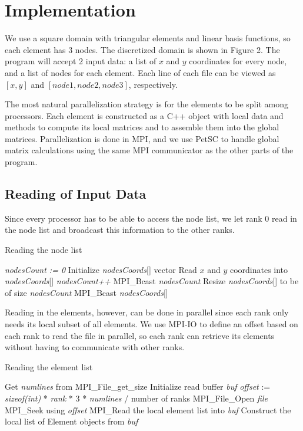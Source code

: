 \documentclass[12pt]{extreport}
\begin{document}
\section*{Implementation}
We use a square domain with triangular elements and linear basis functions, so each element has 3 nodes. The discretized domain is shown in Figure 2. The program will accept 2 input data: a list of $x$ and $y$ coordinates for every node, and a list of nodes for each element. Each line of each file can be viewed as $[x, y]$ and $[node1, node2, node3]$, respectively.

The most natural parallelization strategy is for the elements to be split among processors. Each element is constructed as a C++ object with local data and methods to compute its local matrices and to assemble them into the global matrices. Parallelization is done in MPI, and we use PetSC to handle global matrix calculations using the same MPI communicator as the other parts of the program.

\subsection*{Reading of Input Data}
 Since every processor has to be able to access the node list, we let rank 0 read in the node list and broadcast this information to the other ranks.
\begin{algorithm}
  \caption{Reading the node list}
  \begin{algorithmic}
     
    \State \textit{nodesCount := 0}
    \State Initialize \textit{nodesCoords}[] vector
    \State Read $x$ and $y$ coordinates into \textit{nodesCoords}[]
    \State \textit{nodesCount++}
    \EndFor
    \EndIf
    \State MPI\_Bcast \textit{nodesCount}
    \State Resize \textit{nodesCoords}[] to be of size \textit{nodesCount}
    \State MPI\_Bcast \textit{nodesCoords}[]
    \EndProcedure
  \end{algorithmic}
\end{algorithm}

Reading in the elements, however, can be done in parallel since each rank only needs its local subset of all elements. We use MPI-IO to define an offset based on each rank to read the file in parallel, so each rank can retrieve its elements without having to communicate with other ranks.
\begin{algorithm}
  \caption{Reading the element list}
  \begin{algorithmic}
    \State Get \textit{numlines} from MPI\_File\_get\_size
    \State Initialize read buffer \textit{buf}
    \State \textit{offset} := \textit{sizeof(int)} * \textit{rank} * 3 * \textit{numlines} / number of ranks
    \State MPI\_File\_Open \textit{file}
    \State MPI\_Seek using \textit{offset}
    \State MPI\_Read the local element list into \textit{buf}
    \State Construct the local list of Element objects from \textit{buf}
    \EndProcedure
  \end{algorithmic}
\end{algorithm}
\end{document}
